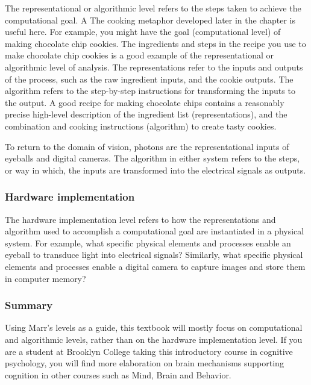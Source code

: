 \documentclass[
  oneside,
  12pt]{crumpbook}
\begin{document}
The representational or algorithmic level refers to the steps taken to achieve the computational goal. A The cooking metaphor developed later in the chapter is useful here. For example, you might have the goal (computational level) of making chocolate chip cookies. The ingredients and steps in the recipe you use to make chocolate chip cookies is a good example of the representational or algorithmic level of analysis. The representations refer to the inputs and outputs of the process, such as the raw ingredient inputs, and the cookie outputs. The algorithm refers to the step-by-step instructions for transforming the inputs to the output. A good recipe for making chocolate chips contains a reasonably precise high-level description of the ingredient list (representations), and the combination and cooking instructions (algorithm) to create tasty cookies.

To return to the domain of vision, photons are the representational inputs of eyeballs and digital cameras. The algorithm in either system refers to the steps, or way in which, the inputs are transformed into the electrical signals as outputs.

\hypertarget{hardware-implementation}{%
\subsubsection{Hardware implementation}\label{hardware-implementation}}

The hardware implementation level refers to how the representations and algorithm used to accomplish a computational goal are instantiated in a physical system. For example, what specific physical elements and processes enable an eyeball to transduce light into electrical signals? Similarly, what specific physical elements and processes enable a digital camera to capture images and store them in computer memory?

\hypertarget{summary}{%
\subsubsection{Summary}\label{summary}}

Using Marr's levels as a guide, this textbook will mostly focus on computational and algorithmic levels, rather than on the hardware implementation level. If you are a student at Brooklyn College taking this introductory course in cognitive psychology, you will find more elaboration on brain mechanisms supporting cognition in other courses such as Mind, Brain and Behavior.
\end{document}
